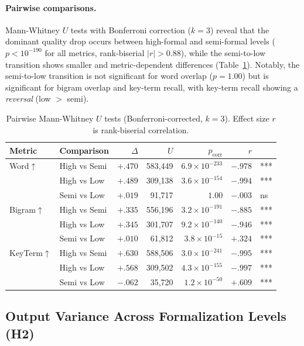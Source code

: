 \documentclass[runningheads]{llncs}
\begin{document}
\paragraph{Pairwise comparisons.}
Mann-Whitney $U$ tests with Bonferroni correction ($k\!=\!3$) reveal that the dominant quality drop occurs between high-formal and semi-formal levels ($p < 10^{-190}$ for all metrics, rank-biserial $|r| > 0.88$), while the semi-to-low transition shows smaller and metric-dependent differences (Table~\ref{tab:pairwise}). Notably, the semi-to-low transition is not significant for word overlap ($p = 1.00$) but is significant for bigram overlap and key-term recall, with key-term recall showing a \emph{reversal} (low $>$ semi).

\begin{table}[h]
\centering
\caption{Pairwise Mann-Whitney $U$ tests (Bonferroni-corrected, $k\!=\!3$). Effect size $r$ is rank-biserial correlation.}
\label{tab:pairwise}
\begin{tabular}{llrrrrl}
\toprule
Metric & Comparison & $\Delta$ & $U$ & $p_{\text{corr}}$ & $r$ & \\
\midrule
Word$\uparrow$
  & High vs Semi & $+.470$ & 583{,}449 & $6.9 \times 10^{-233}$ & $-.978$ & *** \\
  & High vs Low  & $+.489$ & 309{,}138 & $3.6 \times 10^{-154}$ & $-.994$ & *** \\
  & Semi vs Low  & $+.019$ & 91{,}717 & $1.00$ & $-.003$ & ns \\
\midrule
Bigram$\uparrow$
  & High vs Semi & $+.335$ & 556{,}196 & $3.2 \times 10^{-191}$ & $-.885$ & *** \\
  & High vs Low  & $+.345$ & 301{,}707 & $9.2 \times 10^{-140}$ & $-.946$ & *** \\
  & Semi vs Low  & $+.010$ & 61{,}812 & $3.8 \times 10^{-15}$ & $+.324$ & *** \\
\midrule
KeyTerm$\uparrow$
  & High vs Semi & $+.630$ & 588{,}506 & $3.0 \times 10^{-241}$ & $-.995$ & *** \\
  & High vs Low  & $+.568$ & 309{,}502 & $4.3 \times 10^{-155}$ & $-.997$ & *** \\
  & Semi vs Low  & $-.062$ & 35{,}720 & $1.2 \times 10^{-50}$ & $+.609$ & *** \\
\bottomrule
\end{tabular}
\end{table}

\subsection{Output Variance Across Formalization Levels (H2)}
\label{sec:variance}
\end{document}
